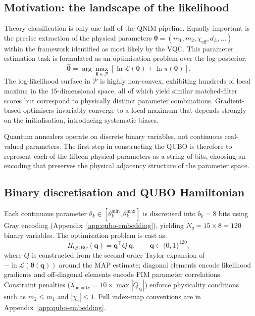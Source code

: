 \documentclass[11pt,a4paper, english]{book}
\theoremstyle{plain}
\theoremstyle{definition}
\numberwithin{equation}{chapter}
\numberwithin{figure}{chapter}
\numberwithin{table}{chapter}
\begin{document}
\subsection{Motivation: the landscape of the likelihood}
\label{subsec:qubo-motivation}

Theory classification is only one half of the QNIM pipeline.  Equally
important is the precise extraction of the physical parameters
$\boldsymbol{\theta} = (m_1, m_2, \chi_\mathrm{eff}, d_L, \ldots)$ within
the framework identified as most likely by the VQC.  This parameter
estimation task is formulated as an optimisation problem over the
log-posterior:
\begin{equation}
  \label{eq:log_posterior}
  \hat{\boldsymbol{\theta}} = \arg\max_{\boldsymbol{\theta}\in\mathcal{P}}
    \left[\ln\mathcal{L}(\boldsymbol{\theta}) + \ln\pi(\boldsymbol{\theta})\right].
\end{equation}
The log-likelihood surface in $\mathcal{P}$ is highly non-convex,
exhibiting hundreds of local maxima in the 15-dimensional space, all
of which yield similar matched-filter scores but correspond to physically
distinct parameter combinations.  Gradient-based optimisers invariably
converge to a local maximum that depends strongly on the initialisation,
introducing systematic biases.

Quantum annealers operate on discrete binary variables, not continuous real-valued
parameters. The first step in constructing the QUBO is therefore to represent each
of the fifteen physical parameters as a string of bits, choosing an encoding that
preserves the physical adjacency structure of the parameter space.

\subsection{Binary discretisation and QUBO Hamiltonian}
\label{subsec:binary-discretisation}

Each continuous parameter $\theta_k \in [\theta_k^\mathrm{min}, \theta_k^\mathrm{max}]$
is discretised into $b_k = 8$ bits using Gray encoding (Appendix~\ref{app:qubo-embedding}),
yielding $N_q = 15 \times 8 = 120$ binary variables. The optimisation
problem is cast as:
\begin{equation}
  \label{eq:qubo}
  H_\mathrm{QUBO}(\mathbf{q}) = \mathbf{q}^\top Q\,\mathbf{q},
  \qquad \mathbf{q} \in \{0,1\}^{120},
\end{equation}
where $Q$ is constructed from the second-order Taylor expansion of
$-\ln\mathcal{L}(\boldsymbol{\theta}(\mathbf{q}))$ around the MAP estimate;
diagonal elements encode likelihood gradients and off-diagonal elements
encode FIM parameter correlations. Constraint penalties
($\lambda_\mathrm{penalty} = 10\times\max|Q_{ij}|$) enforce physicality
conditions such as $m_2 \leq m_1$ and $|\chi_i|\leq 1$. Full index-map
conventions are in Appendix~\ref{app:qubo-embedding}.
\end{document}
